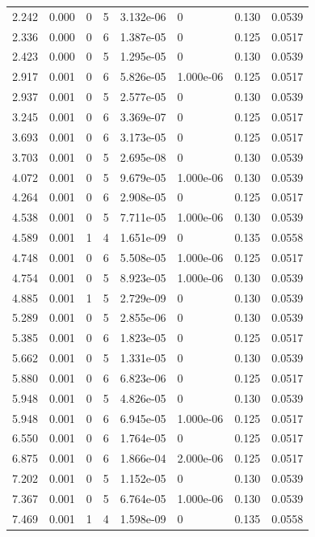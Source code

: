 \documentclass[preview]{standalone}
\begin{document}
{{\begin{tabular}{L{1.2cm}C{1.2cm} C{0.3cm}C{0.5cm} C{1.4cm}C{1.4cm} C{1.4cm}C{1.4cm}}
  2.242  &  0.000  & 0     &  5 &  3.132e-06  & 0  & 0.130 &  0.0539   \\ 
  2.336  &  0.000  & 0     &  6 &  1.387e-05  & 0  & 0.125 &  0.0517   \\ 
  2.423  &  0.000  & 0     &  5 &  1.295e-05  & 0  & 0.130 &  0.0539   \\ 
  2.917  &  0.001  & 0     &  6 &  5.826e-05  & 1.000e-06  & 0.125 &  0.0517   \\ 
  2.937  &  0.001  & 0     &  5 &  2.577e-05  & 0  & 0.130 &  0.0539   \\ 
  3.245  &  0.001  & 0     &  6 &  3.369e-07  & 0  & 0.125 &  0.0517   \\ 
  3.693  &  0.001  & 0     &  6 &  3.173e-05  & 0  & 0.125 &  0.0517   \\ 
  3.703  &  0.001  & 0     &  5 &  2.695e-08  & 0  & 0.130 &  0.0539   \\ 
  4.072  &  0.001  & 0     &  5 &  9.679e-05  & 1.000e-06  & 0.130 &  0.0539   \\ 
  4.264  &  0.001  & 0     &  6 &  2.908e-05  & 0  & 0.125 &  0.0517   \\ 
  4.538  &  0.001  & 0     &  5 &  7.711e-05  & 1.000e-06  & 0.130 &  0.0539   \\ 
  4.589  &  0.001  & 1     &  4 &  1.651e-09  & 0  & 0.135 &  0.0558   \\ 
  4.748  &  0.001  & 0     &  6 &  5.508e-05  & 1.000e-06  & 0.125 &  0.0517   \\ 
  4.754  &  0.001  & 0     &  5 &  8.923e-05  & 1.000e-06  & 0.130 &  0.0539   \\ 
  4.885  &  0.001  & 1     &  5 &  2.729e-09  & 0  & 0.130 &  0.0539   \\ 
  5.289  &  0.001  & 0     &  5 &  2.855e-06  & 0  & 0.130 &  0.0539   \\ 
  5.385  &  0.001  & 0     &  6 &  1.823e-05  & 0  & 0.125 &  0.0517   \\ 
  5.662  &  0.001  & 0     &  5 &  1.331e-05  & 0  & 0.130 &  0.0539   \\ 
  5.880  &  0.001  & 0     &  6 &  6.823e-06  & 0  & 0.125 &  0.0517   \\ 
  5.948  &  0.001  & 0     &  5 &  4.826e-05  & 0  & 0.130 &  0.0539   \\ 
  5.948  &  0.001  & 0     &  6 &  6.945e-05  & 1.000e-06  & 0.125 &  0.0517   \\ 
  6.550  &  0.001  & 0     &  6 &  1.764e-05  & 0  & 0.125 &  0.0517   \\ 
  6.875  &  0.001  & 0     &  6 &  1.866e-04  & 2.000e-06  & 0.125 &  0.0517   \\ 
  7.202  &  0.001  & 0     &  5 &  1.152e-05  & 0  & 0.130 &  0.0539   \\ 
  7.367  &  0.001  & 0     &  5 &  6.764e-05  & 1.000e-06  & 0.130 &  0.0539   \\ 
  7.469  &  0.001  & 1     &  4 &  1.598e-09  & 0  & 0.135 &  0.0558   \\ 
\hline 
\end{tabular} 

}}
\end{document}

